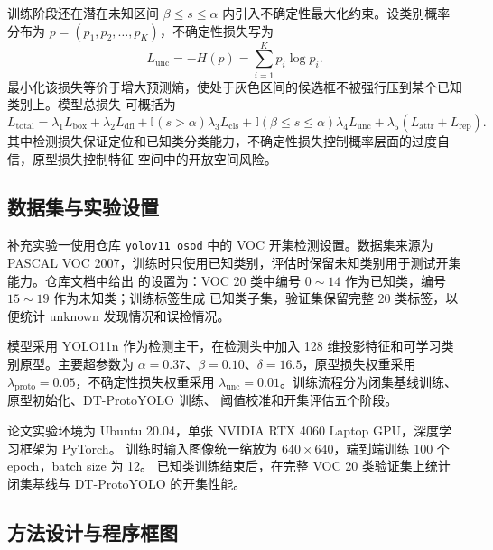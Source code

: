 \documentclass[UTF8,a4paper,12pt]{ctexart}
\begin{document}
训练阶段还在潜在未知区间 $\beta \le s \le \alpha$ 内引入不确定性最大化约束。设类别概率分布为
$p=(p_1,p_2,\ldots,p_K)$，不确定性损失写为
\begin{equation}
  L_{\mathrm{unc}}=-H(p)=\sum_{i=1}^{K}p_i\log p_i .
\end{equation}
最小化该损失等价于增大预测熵，使处于灰色区间的候选框不被强行压到某个已知类别上。模型总损失
可概括为
\begin{equation}
  L_{\mathrm{total}}
  =\lambda_1L_{\mathrm{box}}+\lambda_2L_{\mathrm{dfl}}
  +\mathbb{I}(s>\alpha)\lambda_3L_{\mathrm{cls}}
  +\mathbb{I}(\beta\le s\le\alpha)\lambda_4L_{\mathrm{unc}}
  +\lambda_5(L_{\mathrm{attr}}+L_{\mathrm{rep}}).
\end{equation}
其中检测损失保证定位和已知类分类能力，不确定性损失控制概率层面的过度自信，原型损失控制特征
空间中的开放空间风险。

\subsection{数据集与实验设置}

补充实验一使用仓库 \texttt{yolov11\_osod} 中的 VOC 开集检测设置。数据集来源为
PASCAL VOC 2007，训练时只使用已知类别，评估时保留未知类别用于测试开集能力。仓库文档中给出
的设置为：VOC 20 类中编号 $0\sim14$ 作为已知类，编号 $15\sim19$ 作为未知类；训练标签生成
已知类子集，验证集保留完整 20 类标签，以便统计 unknown 发现情况和误检情况。

\begin{table}[H]
\centering
\caption{补充实验一主要模块与设置}
\label{tab:supp_osod_components}
\footnotesize

\end{table}

模型采用 YOLO11n 作为检测主干，在检测头中加入 128 维投影特征和可学习类别原型。主要超参数为
$\alpha=0.37$、$\beta=0.10$、$\delta=16.5$，原型损失权重采用
$\lambda_{\mathrm{proto}}=0.05$，不确定性损失权重采用
$\lambda_{\mathrm{unc}}=0.01$。训练流程分为闭集基线训练、原型初始化、DT-ProtoYOLO 训练、
阈值校准和开集评估五个阶段。

论文实验环境为 Ubuntu 20.04，单张 NVIDIA RTX 4060 Laptop GPU，深度学习框架为 PyTorch。
训练时输入图像统一缩放为 $640\times640$，端到端训练 100 个 epoch，batch size 为 12。
已知类训练结束后，在完整 VOC 20 类验证集上统计闭集基线与 DT-ProtoYOLO 的开集性能。

\subsection{方法设计与程序框图}
\end{document}
